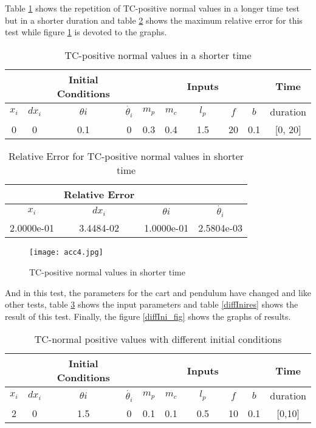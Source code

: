 \documentclass[12pt, titlepage]{article}
\begin{document}
Table \ref{norm} shows the repetition of TC-positive normal values in a longer time test but in a shorter duration and table \ref{normres} shows the maximum relative error for this test while figure \ref{norm20} is devoted to the graphs.\\

\begin{table}[ht]
\caption{TC-positive normal values in a shorter time} \label{norm}
\vspace*{2mm}
\centering
 \begin{tabular}{|c c c c|c c c c c|c|} 
 \hline
&&\textbf{Initial Conditions}& &  &  &  \textbf{Inputs} &  &&\textbf{Time}  \\ \hline
$x_i$&$dx_i$&$\theta{i}$&$\dot{\theta_{i}}$ & $m_p$ & $m_c$ & $l_p$ & $f$ & $b$  & duration \\ \hline
0 & 0 & 0.1 & 0 & 0.3 & 0.4 & 1.5 & 20 & 0.1 &[0, 20]\\
 \hline
\end{tabular}
\end{table}	


\begin{table}[ht]
\caption{Relative Error for TC-positive normal values in shorter time} \label{normres}
\vspace*{2mm}
\centering
 \begin{tabular}{|c c c c|} 
 \hline
&\textbf{Relative Error}&&\\ \hline
$x_i$&$dx_i$&$\theta{i}$&$\dot{\theta_{i}}$ \\ \hline
2.0000e-01& 3.4484-02 & 1.0000e-01 & 2.5804e-03
\\ \hline
\end{tabular}
\end{table}	


\begin{figure}[H]
\begin{center}
\texttt{[image: acc4.jpg]}
 \caption{TC-positive normal values in shorter time}
 \label{norm20}
 \end{center}
 \end{figure}


And in this test, the parameters for the cart and pendulum have changed and like other tests, table \ref{diffIni} shows the input parameters and table \ref{diffInires} shows the result of this test. Finally, the figure \ref{diffIni_fig} shows the graphs of results.

\begin{table}[ht]
\caption{TC-normal positive values with different initial conditions} \label{diffIni}
\vspace*{2mm}
\centering
 \begin{tabular}{|c c c c|c c c c c|c|} 
 \hline
&&\textbf{Initial Conditions}& &  &  &  \textbf{Inputs} &  &&\textbf{Time}  \\ \hline
$x_i$&$dx_i$&$\theta{i}$&$\dot{\theta_{i}}$ & $m_p$ & $m_c$ & $l_p$ & $f$ & $b$  & duration \\ \hline
2 & 0 & 1.5 & 0 & 0.1 & 0.1 & 0.5 & 10 & 0.1 & [0,10]\\
 \hline
\end{tabular}
\end{table}	
\end{document}
